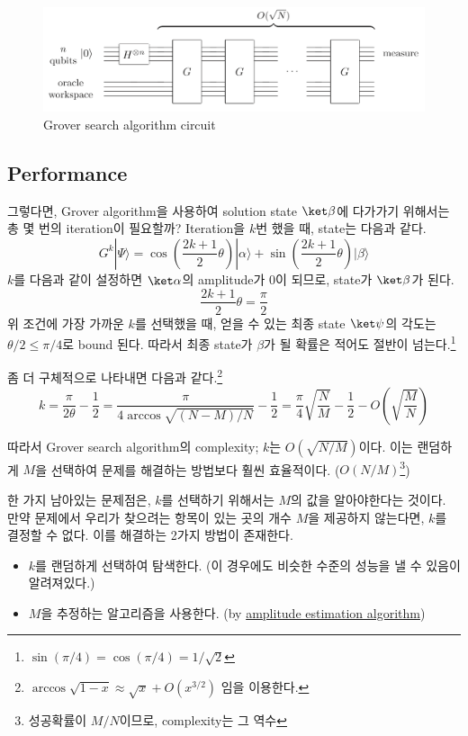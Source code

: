 \begin{figure}[h]
  \centering
  \includegraphics[width=0.65\linewidth]{figures/Grover_circuit.png}
  \caption{Grover search algorithm circuit}
  \label{fig:grover-search-circuit}
\end{figure}

\subsection{Performance}
그렇다면, Grover algorithm을 사용하여 solution state $\ket \beta$에 다가가기 위해서는 총 몇 번의 iteration이 필요할까?
Iteration을 $k$번 했을 때, state는 다음과 같다.
\begin{equation*}
  G^k|\Psi\rangle=\cos \left(\frac{2 k+1}{2} \theta\right)|\alpha\rangle+\sin \left(\frac{2 k+1}{2} \theta\right)|\beta\rangle
\end{equation*}
$k$를 다음과 같이 설정하면 $\ket \alpha$의 amplitude가 0이 되므로, state가 $\ket \beta$가 된다.
\begin{equation*}
  \frac{2 k+1}{2} \theta=\frac{\pi}{2}
\end{equation*}
위 조건에 가장 가까운 $k$를 선택했을 때, 얻을 수 있는 최종 state $\ket \psi$의 각도는 $\theta / 2 \leq \pi / 4$로 bound 된다. 따라서 최종 state가 $\beta$가 될 확률은 적어도 절반이 넘는다.\footnote{$\sin(\pi/4) = \cos(\pi/4) = 1/\sqrt{2}$}

좀 더 구체적으로 나타내면 다음과 같다.\footnote{$\arccos \sqrt{1-x} \approx \sqrt{x}+O\left(x^{3 / 2}\right)$ 임을 이용한다.}
\begin{equation*}
  k=\frac{\pi}{2 \theta}-\frac{1}{2}=\frac{\pi}{4 \arccos \sqrt{(N-M) / N}}-\frac{1}{2}=\frac{\pi}{4} \sqrt{\frac{N}{M}}-\frac{1}{2}-O\left(\sqrt{\frac{M}{N}}\right)
\end{equation*}

따라서 Grover search algorithm의 complexity; $k$는 $O(\sqrt{N/M})$이다. 이는 랜덤하게 $M$을 선택하여 문제를 해결하는 방법보다 훨씬 효율적이다. ($O(N/M)$\footnote{성공확률이 $M/N$이므로, complexity는 그 역수})

한 가지 남아있는 문제점은, $k$를 선택하기 위해서는 $M$의 값을 알아야한다는 것이다. 
만약 문제에서 우리가 찾으려는 항목이 있는 곳의 개수 $M$을 제공하지 않는다면, $k$를 결정할 수 없다. 이를 해결하는 2가지 방법이 존재한다.
\begin{itemize}
  \item $k$를 랜덤하게 선택하여 탐색한다. (이 경우에도 비슷한 수준의 성능을 낼 수 있음이 알려져있다.)
  \item $M$을 추정하는 알고리즘을 사용한다. (by \hyperref[sec:amplitude-estimation]{amplitude estimation algorithm})
\end{itemize} 

